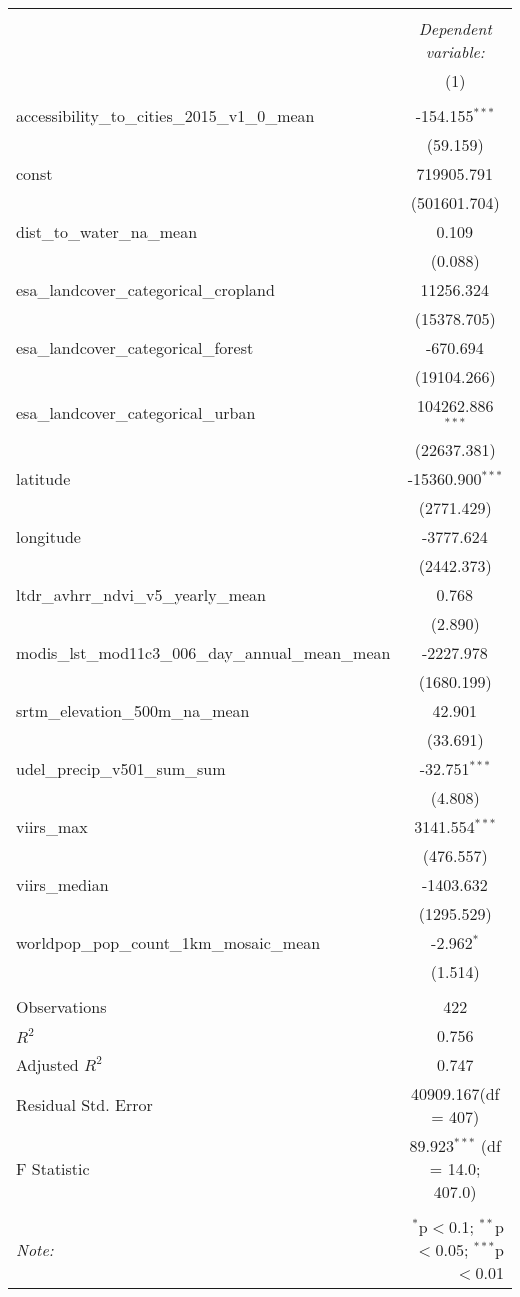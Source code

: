 \begin{table}[!htbp] \centering
\begin{tabular}{@{\extracolsep{5pt}}lc}
\\[-1.8ex]\hline
\hline \\[-1.8ex]
& \multicolumn{1}{c}{\textit{Dependent variable:}} \
\cr \cline{1-2}
\\[-1.8ex] & (1) \\
\hline \\[-1.8ex]
 accessibility_to_cities_2015_v1_0_mean & -154.155$^{***}$ \\
  & (59.159) \\
 const & 719905.791$^{}$ \\
  & (501601.704) \\
 dist_to_water_na_mean & 0.109$^{}$ \\
  & (0.088) \\
 esa_landcover_categorical_cropland & 11256.324$^{}$ \\
  & (15378.705) \\
 esa_landcover_categorical_forest & -670.694$^{}$ \\
  & (19104.266) \\
 esa_landcover_categorical_urban & 104262.886$^{***}$ \\
  & (22637.381) \\
 latitude & -15360.900$^{***}$ \\
  & (2771.429) \\
 longitude & -3777.624$^{}$ \\
  & (2442.373) \\
 ltdr_avhrr_ndvi_v5_yearly_mean & 0.768$^{}$ \\
  & (2.890) \\
 modis_lst_mod11c3_006_day_annual_mean_mean & -2227.978$^{}$ \\
  & (1680.199) \\
 srtm_elevation_500m_na_mean & 42.901$^{}$ \\
  & (33.691) \\
 udel_precip_v501_sum_sum & -32.751$^{***}$ \\
  & (4.808) \\
 viirs_max & 3141.554$^{***}$ \\
  & (476.557) \\
 viirs_median & -1403.632$^{}$ \\
  & (1295.529) \\
 worldpop_pop_count_1km_mosaic_mean & -2.962$^{*}$ \\
  & (1.514) \\
\hline \\[-1.8ex]
 Observations & 422 \\
 $R^2$ & 0.756 \\
 Adjusted $R^2$ & 0.747 \\
 Residual Std. Error & 40909.167(df = 407)  \\
 F Statistic & 89.923$^{***}$ (df = 14.0; 407.0) \\
\hline
\hline \\[-1.8ex]
\textit{Note:} & \multicolumn{1}{r}{$^{*}$p$<$0.1; $^{**}$p$<$0.05; $^{***}$p$<$0.01} \\
\end{tabular}
\end{table}